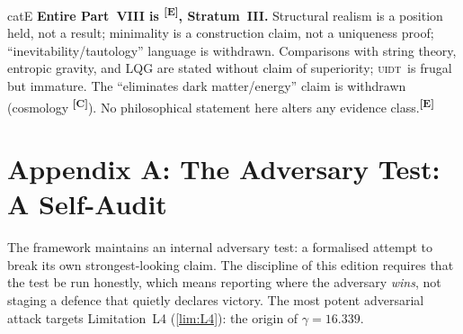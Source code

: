 \documentclass[12pt,a4paper,twoside]{article}
\theoremstyle{plain}
\theoremstyle{definition}
\theoremstyle{remark}
\newcommand{\UIDT}{\textsc{uidt}}
\newcommand{\catmark}[1]{\textsuperscript{\textsf{\textbf{[#1]}}}}
\newcommand{\GammaGeom}{16.339} %
\begin{document}
\begin{evidencebox}{catE}
\textbf{Entire Part~VIII is \catmark{E}, Stratum~III.} Structural realism is a position held, not a result; minimality is a construction claim, not a uniqueness proof; ``inevitability/tautology'' language is withdrawn. Comparisons with string theory, entropic gravity, and LQG are stated without claim of superiority; \UIDT\ is frugal but immature. The ``eliminates dark matter/energy'' claim is withdrawn (cosmology \catmark{C}). No philosophical statement here alters any evidence class.\catmark{E}
\end{evidencebox}


\newpage
\section*{Appendix A: The Adversary Test: A Self-Audit}
\label{app:adversary}

\noindent The framework maintains an internal adversary test: a formalised attempt to break its own strongest-looking claim. The discipline of this edition requires that the test be run honestly, which means reporting where the adversary \emph{wins}, not staging a defence that quietly declares victory. The most potent adversarial attack targets Limitation~L4 (\cref{lim:L4}): the origin of $\gamma = \GammaGeom$.
\end{document}
